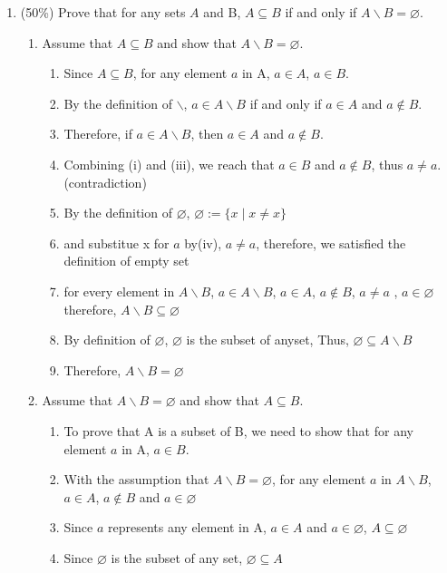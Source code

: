 \documentclass[10pt]{article}
\begin{document}
\begin{enumerate}
  \item (50\%) Prove that for any sets $A$ and B, $A \subseteq B$ if and only if $A \backslash B=\varnothing$.
    \begin{enumerate}
      \item Assume that $A \subseteq B$ and show that $A \backslash B=\varnothing$.
      \begin{enumerate}
        \item Since $A \subseteq B$, for any element $a$ in A, $a \in A$, $a \in B$.
        \item By the definition of $\backslash$, $a \in A \backslash B$ if and only if $a \in A$ and $a \notin B$.
        \item Therefore, if $a \in A \backslash B$, then $a \in A$ and $a \notin B$. 
        \item Combining (i) and (iii), we reach that $a \in B$ and $a \notin B$, thus $ a \neq a$.(contradiction)
        \item By the definition of $\varnothing$, $\varnothing:=\{x \mid x \neq x\}$
        \item and substitue x for $a$ by(iv), $a \neq a$, therefore, we satisfied the definition of empty set
        \item for every element in $A \backslash B$, $a \in A \backslash B$, $a \in A$, $a \notin B$, $a \neq a$ , $a \in \varnothing $ 
        therefore, $A \backslash B \subseteq \varnothing$
        \item By definition of $\varnothing$, $\varnothing$ is the subset of anyset, Thus, $\varnothing \subseteq A \backslash B$
        \item Therefore, $A \backslash B = \varnothing$
      \end{enumerate}
      \item Assume that $A \backslash B=\varnothing$ and show that $A \subseteq B$.
      \begin{enumerate}
        \item To prove that A is a subset of B, we need to show that for any element $a$ in A, $a \in B$.
        \item With the assumption that $A \backslash B=\varnothing$, for any element $a$ in $A \backslash B$, $ a \in A$, $a \notin B$ and $a \in \varnothing$
        \item Since $a$ represents any element in A, $a \in A$ and $a \in \varnothing$, $A \subseteq \varnothing$
        \item Since $\varnothing$ is the subset of any set, $\varnothing \subseteq A$

\end{enumerate}
\end{enumerate}
\end{enumerate}
\end{document}

